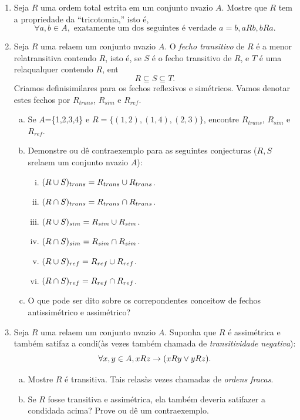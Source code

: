 \begin{enumerate}[{\bf 1.}]
\item Seja $R$ uma ordem total estrita em um conjunto n\ao vazio $A$. Mostre que $R$ tem a propriedade da ``tricotomia,'' isto \'e,
\[
\forall a,b\in A, \textrm{ exatamente um dos seguintes \'e verdade } a=b, aRb, bRa.
\]


\item\label{relexer17} Seja $R$ uma rela\cao em um conjunto n\ao vazio $A$. O {\it fecho transitivo} de $R$ \'e a menor rela\cao transitiva contendo $R$, isto \'e, se $S$ \'e o fecho transitivo de $R$, e $T$ \'e uma rela\cao qualquer contendo $R$, ent\ao
\[
R\subseteq S\subseteq T.
\]
Criamos defini\coes similares para os fechos reflexivos e sim\'etricos. Vamos denotar estes fechos por $R_{trans}$, $R_{sim}$ e $R_{ref}$. 
\begin{enumerate}[a)]
\item Se $A$=\{1,2,3,4\} e $R=\{(1,2),(1,4),(2,3)\}$, encontre $R_{trans}$, $R_{sim}$ e $R_{ref}$. 
\item Demonstre ou d\^e contraexemplo para as seguintes conjecturas ($R,S$ s\ao rela\coes em um conjunto n\ao vazio $A$):
\begin{enumerate}[i)]
\item $(R\cup S)_{trans}=R_{trans}\cup R_{trans}$.
\item $(R\cap S)_{trans}=R_{trans}\cap R_{trans}$.
\item $(R\cup S)_{sim}=R_{sim}\cup R_{sim}$.
\item $(R\cap S)_{sim}=R_{sim}\cap R_{sim}$.
\item $(R\cup S)_{ref}=R_{ref}\cup R_{ref}$.
\item $(R\cap S)_{ref}=R_{ref}\cap R_{ref}$.
\end{enumerate}
\item O que pode ser dito sobre os correpondentes conceitow de fechos antissim\'etrico e assim\'etrico?
\end{enumerate}

\item Seja $R$ uma rela\cao em um conjunto n\ao vazio $A$. Suponha que $R$ \'e assim\'etrica e tamb\'em satifaz a condi\cao (\`as vezes tamb\'em chamada de {\it transitividade negativa}):
\[
\forall x,y\in A, xRz\to (xRy\vee yRz).
\]
\begin{enumerate}[a)]
\item Mostre $R$ \'e transitiva. Tais rela\coes s\ao \`as vezes chamadas de {\it ordens fracas}.
\item Se $R$ fosse transitiva e assim\'etrica, ela tamb\'em deveria satifazer a condi\cao dada acima? Prove ou d\^e um contraexemplo.
\end{enumerate}



\end{enumerate}
